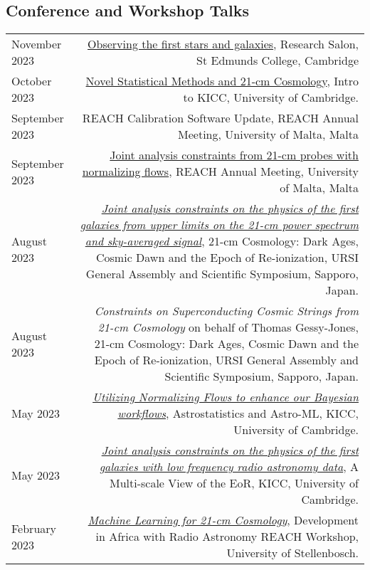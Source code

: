 \documentclass{article}
\begin{document}
\subsection*{Conference and Workshop Talks}
\begin{tabular}{L!{\vrule}R}
    November 2023 & \href{https://github.com/htjb/Talks/raw/master/Talks/St_Edmunds_Research_Salon_Nov_2023/research_salon.pdf}{Observing the first stars and galaxies}, Research Salon, St Edmunds College, Cambridge \\
    October 2023 & \href{https://github.com/htjb/Talks/raw/master/Talks/KICC_Intro_23/kicc_intro_23.pdf}{Novel Statistical Methods and 21-cm Cosmology}, Intro to KICC, University of Cambridge. \\
    September 2023 & REACH Calibration Software Update, REACH Annual Meeting, University of Malta, Malta \\
    September 2023 & \href{https://github.com/htjb/Talks/tree/master/Talks/REACH_Malta/joint_analysis_margarine.pdf}{Joint analysis constraints from 21-cm probes with normalizing flows}, REACH Annual Meeting, University of Malta, Malta \\
    August 2023 & \href{https://github.com/htjb/Talks/raw/master/Talks/URSI_2023/joint_analysis_margarine.pdf}{\textit{Joint analysis constraints on the physics of the first galaxies from upper limits on the 21-cm power spectrum and sky-averaged signal}}, 21-cm Cosmology: Dark Ages, Cosmic Dawn and the Epoch of Re-ionization, URSI General Assembly and Scientific Symposium, Sapporo, Japan. \\
    August 2023 & \textit{Constraints on Superconducting Cosmic Strings from 21-cm Cosmology} on behalf of Thomas Gessy-Jones, 21-cm Cosmology: Dark Ages, Cosmic Dawn and the Epoch of Re-ionization, URSI General Assembly and Scientific Symposium, Sapporo, Japan. \\
    May 2023 & \href{https://github.com/htjb/Talks/blob/master/Talks/KICC_EoR/Bevins_KICC_EoR.pdf}{\textit{Utilizing Normalizing Flows to enhance our Bayesian workflows}}, Astrostatistics and Astro-ML, KICC, University of Cambridge. \\
    May 2023 & \href{https://github.com/htjb/Talks/blob/master/Talks/KICC_EoR/Bevins_KICC_EoR.pdf}{\textit{Joint analysis constraints on the physics of the first galaxies with low frequency radio astronomy data}}, A Multi-scale View of the EoR, KICC, University of Cambridge. \\
    February 2023 & \href{https://github.com/htjb/Talks/blob/master/Talks/DARA_REACH_Workshop/DARA_Workshop.pdf}{\textit{Machine Learning for 21-cm Cosmology}}, Development in Africa with Radio Astronomy REACH Workshop, University of Stellenbosch. \\

\end{tabular}
\end{document}
